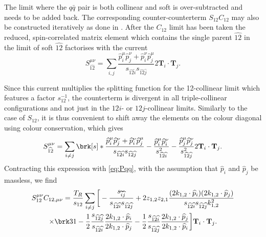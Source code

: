 \documentclass[11pt,a4paper]{article}
\newcommand{\colorT}[1]{\mathbf{T}_{#1}}
\newcommand{\mgd}[1]{\widehat{#1}}
\begin{document}
The limit where the $q\bar{q}$ pair is both collinear and soft is over-subtracted
and needs to be added back.
The corresponding counter-counterterm $S_{12}C_{12}$
may also be constructed iteratively as done in \cite{Somogyi:2005xz}.
After the $C_{12}$ limit has been taken the reduced, spin-correlated matrix element 
which contains the single parent $\mgd{12}$ in the limit of soft $\mgd{12}$
factorises with the current
\begin{equation}
	S_{\mgd{12}}^{\mu\nu}
	= \sum_{i, j}
	\frac{\mgd{p}_i^\mu \mgd{p}_j^\nu + \mgd{p}_i^\nu \mgd{p}_j^\mu}
	{s_{\mgd{12}\mgd{i}} s_{\mgd{12}\mgd{j}}}
	2\colorT{i}\cdot\colorT{j}.
\end{equation}

Since this current multiplies the splitting function for the 12-collinear limit
which features a factor $s_{12}^{-1}$,
the counterterm is divergent in all triple-collinear configurations
and not just in the $12i$- or $12j$-collinear limits.
Similarly to the case of $S_{12}$, it is thus convenient
to shift away the elements on the colour diagonal using colour conservation,
which gives
\begin{equation}
	S_{\mgd{12}}^{\mu\nu}
	= \sum_{i \ne j} \brk[s]*{
		\frac{\mgd{p}_i^\mu \mgd{p}_j^\nu + \mgd{p}_i^\nu \mgd{p}_j^\mu}
		{s_{\mgd{12}\mgd{i}} s_{\mgd{12}\mgd{j}}}
		- \frac{\mgd{p}_i^\mu \mgd{p}_i^\nu}{s_{\mgd{12}\mgd{i}}^2}
		- \frac{\mgd{p}_j^\mu \mgd{p}_j^\nu}{s_{\mgd{12}\mgd{j}}^2}
	} 2 \colorT{i}\cdot\colorT{j}.
\end{equation}
Contracting this expression with \cref{eq:Pqq},
with the assumption that $\mgd{p}_i$ and $\mgd{p}_j$
be massless, we find
\begin{multline}
\label{eq:S12C12iter}
	S_{12}^{\mu\nu} C_{12,\mu\nu}
	= \frac{T_R}{s_{12}} \sum_{i \ne j} \bigg[
		- \frac{s_{\mgd{i}\mgd{j}}}{s_{\mgd{12}\mgd{i}}s_{\mgd{12}\mgd{j}}}
		+ 2 z_{1,2} z_{2,1}
		\frac{(2k_{1,2}\cdot\mgd{p}_i)(2k_{1,2}\cdot\mgd{p}_j)}
		{s_{\mgd{12}\mgd{i}} s_{\mgd{12}\mgd{j}} k_{1,2}^2}
		\\\times
		\brk3{ 1
		- \frac{1}{2} \frac{s_{\mgd{12}\mgd{j}}}{s_{\mgd{12}\mgd{i}}}
		\frac{2k_{1,2}\cdot\mgd{p}_i}{2k_{1,2}\cdot\mgd{p}_j}
		- \frac{1}{2} \frac{s_{\mgd{12}\mgd{i}}}{s_{\mgd{12}\mgd{j}}}
		\frac{2k_{1,2}\cdot\mgd{p}_j}{2k_{1,2}\cdot\mgd{p}_i}
		}
	\bigg] \colorT{i}\cdot\colorT{j}.
\end{multline}
\end{document}
